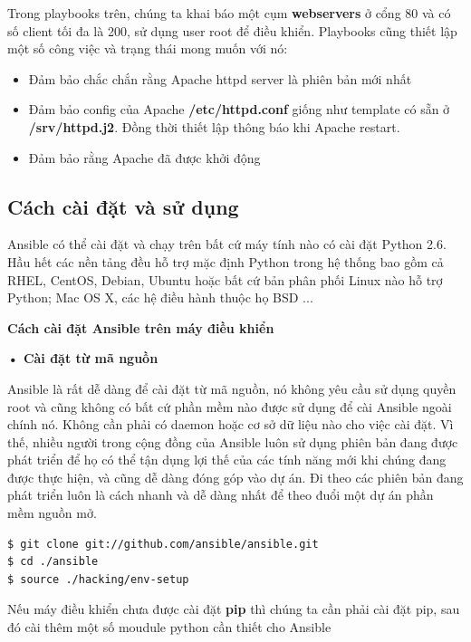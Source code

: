 Trong playbooks trên, chúng ta khai báo một cụm \textbf{webservers} ở cổng 80 và có số client tối đa là 200, sử dụng user root để điều khiển. Playbooks cũng thiết lập một số công việc và trạng thái mong muốn với nó:

\begin{itemize}
\item Đảm bảo chắc chắn rằng Apache httpd server là phiên bản mới nhất
\item Đảm bảo config của Apache \textbf{/etc/httpd.conf} giống như template có sẵn ở \textbf{/srv/httpd.j2}. Đồng thời thiết lập thông báo khi Apache restart.
\item Đảm bảo rằng Apache đã được khởi động
\end{itemize}

\subsection{Cách cài đặt và sử dụng}

Ansible có thể cài đặt và chạy trên bất cứ máy tính nào có cài đặt Python 2.6. Hầu hết các nền tảng đều hỗ trợ mặc định Python trong hệ thống bao gồm cả RHEL, CentOS, Debian, Ubuntu hoặc bất cứ bản phân phối Linux nào hỗ trợ Python; Mac OS X, các hệ điều hành thuộc họ BSD ...

\textbf{\large Cách cài đặt Ansible trên máy điều khiển}

\textbf{• Cài đặt từ mã nguồn}

Ansible là rất dễ dàng để cài đặt từ mã nguồn, nó không yêu cầu sử dụng quyền root và cũng không có bất cứ phần mềm nào được sử dụng để cài Ansible ngoài chính nó. Không cần phải có daemon hoặc cơ sở dữ liệu nào cho việc cài đặt. Vì thế, nhiều người trong cộng đồng của Ansible luôn sử dụng phiên bản đang được phát triển để họ có thể tận dụng lợi thế của các tính năng mới khi chúng đang được thực hiện, và cũng dễ dàng đóng góp vào dự án. Đi theo các phiên bản đang phát triển luôn là cách nhanh và dễ dàng nhất để theo đuổi một dự án phần mềm nguồn mở.


\begin{lstlisting}[label={lst:ansible_install_from_source},caption={Cài đặt Ansible từ mã nguồn}, language=bash, deletekeywords={env}]
$ git clone git://github.com/ansible/ansible.git
$ cd ./ansible
$ source ./hacking/env-setup
\end{lstlisting}

Nếu máy điều khiển chưa được cài đặt \textbf{pip} thì chúng ta cần phải cài đặt pip, sau đó cài thêm một số moudule python cần thiết cho Ansible

